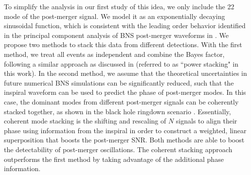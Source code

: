\documentclass[prd,aps,floatfix,superscriptaddress,nofootinbib,twocolumn,10pt,English]{revtex4-1}
\begin{document}
To simplify the analysis in our first study of this idea, 
we only include the 22 mode of the post-merger
signal. We model it as an exponentially decaying sinusoidal
function, which is consistent with the leading order behavior
identified in the principal component analysis of 
BNS post-merger waveforms in \cite{clark2016observing}.
We propose two methods to
stack this data from different detections. With the first method,
we treat all events as independent and combine the 
Bayes factor, following a similar approach as discussed in \cite{meidam2014testing} (referred to as ``power stacking" in this work). 
In the second method, we assume that the theoretical uncertainties in future numerical BNS simulations
can be significantly reduced, such that the inspiral waveform can be used to predict 
the phase of post-merger modes. In this case, the dominant modes from different post-merger signals 
can be coherently stacked together,
as shown in the black hole ringdown scenario \cite{yang2017black}.
Essentially, coherent mode stacking is the shifting
and rescaling of $N$ signals to align their phase 
using information from the inspiral in
order to construct a weighted, linear superposition that boosts the
post-merger SNR. Both methods are able to boost the detectability
of post-merger oscillations. The coherent stacking approach outperforms
the first method by taking advantage of the additional phase information.

\end{document}
